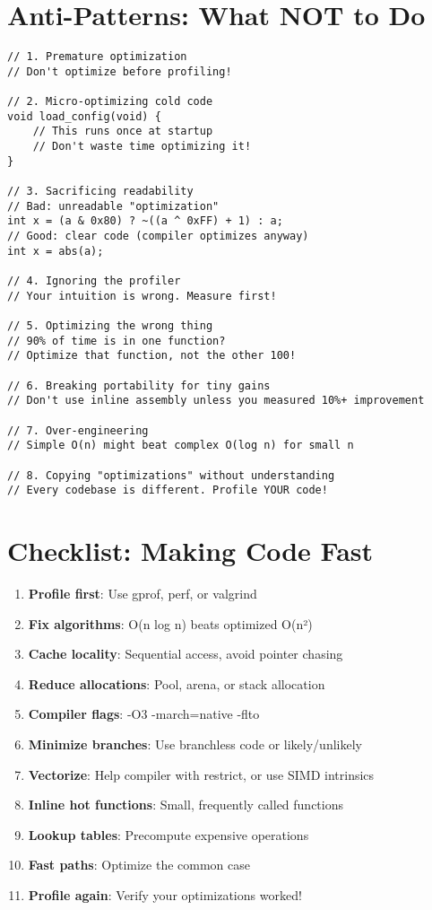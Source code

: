 \section{Anti-Patterns: What NOT to Do}

\begin{lstlisting}
// 1. Premature optimization
// Don't optimize before profiling!

// 2. Micro-optimizing cold code
void load_config(void) {
    // This runs once at startup
    // Don't waste time optimizing it!
}

// 3. Sacrificing readability
// Bad: unreadable "optimization"
int x = (a & 0x80) ? ~((a ^ 0xFF) + 1) : a;
// Good: clear code (compiler optimizes anyway)
int x = abs(a);

// 4. Ignoring the profiler
// Your intuition is wrong. Measure first!

// 5. Optimizing the wrong thing
// 90% of time is in one function?
// Optimize that function, not the other 100!

// 6. Breaking portability for tiny gains
// Don't use inline assembly unless you measured 10%+ improvement

// 7. Over-engineering
// Simple O(n) might beat complex O(log n) for small n

// 8. Copying "optimizations" without understanding
// Every codebase is different. Profile YOUR code!
\end{lstlisting}

\section{Checklist: Making Code Fast}

\begin{enumerate}
    \item \textbf{Profile first}: Use gprof, perf, or valgrind
    \item \textbf{Fix algorithms}: O(n log n) beats optimized O(n²)
    \item \textbf{Cache locality}: Sequential access, avoid pointer chasing
    \item \textbf{Reduce allocations}: Pool, arena, or stack allocation
    \item \textbf{Compiler flags}: -O3 -march=native -flto
    \item \textbf{Minimize branches}: Use branchless code or likely/unlikely
    \item \textbf{Vectorize}: Help compiler with restrict, or use SIMD intrinsics
    \item \textbf{Inline hot functions}: Small, frequently called functions
    \item \textbf{Lookup tables}: Precompute expensive operations
    \item \textbf{Fast paths}: Optimize the common case
    \item \textbf{Profile again}: Verify your optimizations worked!
\end{enumerate}

